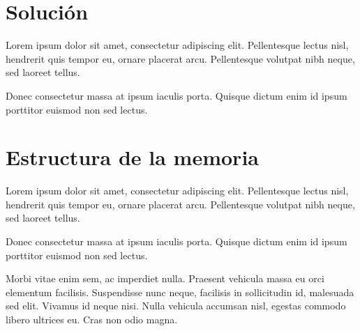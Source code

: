 \section*{Solución}

Lorem ipsum dolor sit amet, consectetur adipiscing elit. Pellentesque lectus
nisl, hendrerit quis tempor eu, ornare placerat arcu. Pellentesque volutpat nibh
neque, sed laoreet tellus.

Donec consectetur massa at ipsum iaculis porta. Quisque dictum enim id ipsum
porttitor euismod non sed lectus.

\section*{Estructura de la memoria}

Lorem ipsum dolor sit amet, consectetur adipiscing elit. Pellentesque lectus
nisl, hendrerit quis tempor eu, ornare placerat arcu. Pellentesque volutpat nibh
neque, sed laoreet tellus.

Donec consectetur massa at ipsum iaculis porta. Quisque dictum enim id ipsum
porttitor euismod non sed lectus.

Morbi vitae enim sem, ac imperdiet nulla. Praesent vehicula massa eu orci
elementum facilisis. Suspendisse nunc neque, facilisis in sollicitudin id,
malesuada sed elit. Vivamus id neque nisi. Nulla vehicula accumsan nisl, egestas
commodo libero ultrices eu. Cras non odio magna.